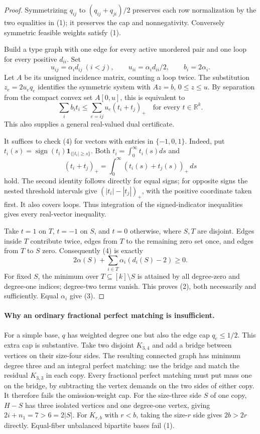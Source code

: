 \documentclass[11pt]{article}
\newcommand{\R}{\mathbb R}
\begin{document}
\begin{proof}
Symmetrizing $q_{ij}$ to $(q_{ij}+q_{ji})/2$ preserves each row
normalization by the two equalities in (1); it preserves the cap and
nonnegativity. Conversely symmetric feasible weights satisfy (1).

Build a type graph with one edge for every active unordered pair and
one loop for every positive $d_{ii}$. Set
\[
 u_{ij}=\alpha_id_{ij}\ (i<j),\qquad
 u_{ii}=\alpha_id_{ii}/2,\qquad b_i=2\alpha_i.
\]
Let $A$ be its unsigned incidence matrix, counting a loop twice.
The substitution $z_e=2u_eq_e$ identifies the symmetric system with
$Az=b$, $0\leq z\leq u$. By separation from the compact convex set
$A[0,u]$, this is equivalent to
\[
 \sum_i b_it_i\leq\sum_{e=ij}u_e(t_i+t_j)_+
                    \quad\text{for every }t\in\R^k.       \tag{4}
\]
This also supplies a general real-valued dual certificate.

It suffices to check (4) for vectors with entries in $\{-1,0,1\}$.
Indeed, put $t_i(s)=\operatorname{sign}(t_i)
\boldsymbol1_{\{|t_i|\geq s\}}$. Both $t_i=\int_0^\infty t_i(s)ds$
and
\[
 (t_i+t_j)_+=\int_0^\infty(t_i(s)+t_j(s))_+\,ds
\]
hold. The second identity follows directly for equal signs; for
opposite signs the nested threshold intervals give
$(|t_i|-|t_j|)_+$, with the positive coordinate taken first.
It also covers loops. Thus integration of the signed-indicator
inequalities gives every real-vector inequality.

Take $t=1$ on $T$, $t=-1$ on $S$, and $t=0$ otherwise, where $S,T$
are disjoint. Edges inside $T$ contribute twice, edges from $T$ to
the remaining zero set once, and edges from $T$ to $S$ zero.
Consequently (4) is exactly
\[
 2\alpha(S)+\sum_{i\in T}\alpha_i(d_i(S)-2)\geq0.    \tag{5}
\]
For fixed $S$, the minimum over $T\subseteq[k]\setminus S$ is attained
by all degree-zero and degree-one indices; degree-two terms vanish.
This proves (2), both necessarily and sufficiently. Equal $\alpha_i$
give (3).
\end{proof}

\paragraph{Why an ordinary fractional perfect matching is insufficient.}
For a simple base, $q$ has weighted degree one but also the edge cap
$q_e\leq1/2$. This extra cap is substantive. Take two disjoint
$K_{3,4}$ and add a bridge between vertices on their size-four sides.
The resulting connected graph has minimum degree three and an integral
perfect matching: use the bridge and match the residual $K_{3,3}$ in
each copy. Every fractional perfect matching must put mass one on the
bridge, by subtracting the vertex demands on the two sides of either
copy. It therefore fails the omission-weight cap. For the size-three
side $S$ of one copy, $H-S$ has three isolated vertices and one
degree-one vertex, giving $2i+n_1=7>6=2|S|$.
For $K_{r,b}$ with $r<b$, taking the size-$r$ side gives
$2b>2r$ directly. Equal-fiber unbalanced bipartite bases fail (1).
\end{document}
